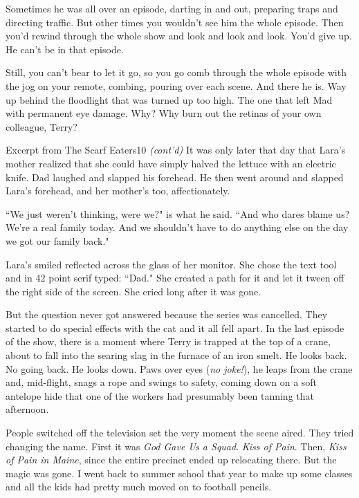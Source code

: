 \documentclass[10pt,twoside]{report}
\begin{document}
Sometimes he was all over an episode, darting in and out, preparing
traps and directing traffic. But other times you wouldn't see him the
whole episode.  Then you'd rewind through the whole show and look and
look and look.  You'd give up.  He can't be in that episode.

Still, you can't bear to let it go, so you go comb through the whole
episode with the jog on your remote, combing, pouring over each scene.
And there he is.  Way up behind the floodlight that was turned up too
high.  The one that left Mad with permanent eye damage.  Why?  Why
burn out the retinas of your own colleague, Terry?

	\begin{sidebar}{Excerpt from The Scarf Eaters}{10}
		\textit{(cont'd)} It was only later that day that Lara's mother realized that she could have simply halved the lettuce with an electric knife. Dad laughed and slapped his forehead. He then went around and slapped Lara's forehead, and her mother's too, affectionately.\vspace{6pt}
		
		``We just weren't thinking, were we?" is what he said. ``And who dares blame us? We're a real family today. And we shouldn't have to do anything else on the day we got our family back."\vspace{6pt}

		Lara's smiled reflected across the glass of her monitor. She chose the text tool and in 42 point serif typed: ``Dad." She created a path for it and let it tween off the right side of the screen. She cried long after it was gone.
	\end{sidebar}

But the question never got answered because the series was cancelled.
They started to do special effects with the cat and it all fell apart.
In the last episode of the show, there is a moment where Terry is
trapped at the top of a crane, about to fall into the searing slag in
the furnace of an iron smelt.  He looks back.  No going back.  He
looks down.  Paws over eyes ({\em no joke!}), he leaps from the crane
and, mid-flight, snags a rope and swings to safety, coming down on a
soft antelope hide that one of the workers had presumably been tanning
that afternoon.

People switched off the television set the very moment the scene
aired.  They tried changing the name. First it was {\em God Gave Us a
  Squad}.  {\em Kiss of Pain}.  Then, {\em Kiss of Pain in Maine},
since the entire precinct ended up relocating there.  But the magic
was gone.  I went back to summer school that year to make up some
classes and all the kids had pretty much moved on to football pencils.
\end{document}
